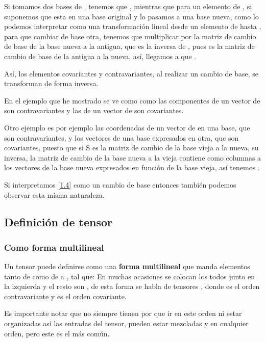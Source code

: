 Si tomamos dos bases de , tenemos que , mientras que para un elemento de , si suponemos que esta en una base original y lo pasamos a una base nueva, como lo podemos interpretar como una transformación lineal desde un elemento de  hasta \lrg{$\R$}, para que cambiar de base otra, tenemos que multiplicar por la matriz de cambio de base de la base nueva a la antigua, que es la inversa de , pues  es la matriz de cambio de base de la antigua a la nueva, así, llegamos a que .

Así, los elementos covariantes y contravariantes, al realizar un cambio de base, se transforman de forma inversa.

En el ejemplo que he mostrado se ve como como las componentes de un vector de  son contravariantes y las de un vector de  son covariantes.

Otro ejemplo es por ejemplo las coordenadas de un vector de  en una base, que son contravariantes, y los vectores de una base expresados en otra, que son covariantes, puesto que si S es la matriz de cambio de la base vieja a la nueva, su inversa, la matriz de cambio de la base nueva a la vieja contiene como columnas a los vectores de la base nueva expresados en función de la base vieja, así tenemos .

Si interpretamos \ref{1.4} como un cambio de base entonces también podemos observar esta misma naturaleza.
\subsection{Definición de tensor}
\subsubsection{Como forma multilineal}
Un tensor puede definirse como una \textbf{forma multilineal} que manda elementos tanto de  como de  a \lrg{$\R$}, tal que:
\lrg{\[T: V^1 \times \dots \times V^k \rightarrow \R \;\;\;\; \; V^i = \{V\mbox{ o }V^*\}\]}
En muchas ocasiones se colocan los  todos junto en la izquierda y el resto son , de esta forma se habla de tensores , donde  es el orden contravariante y  es el orden covariante.

Es importante notar que no siempre tienen por que ir en este orden ni estar organizadas así las entradas del tensor, pueden estar mezcladas y en cualquier orden, pero este es el más común.

